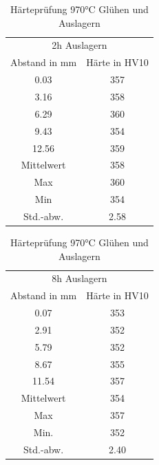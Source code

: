 \documentclass[a4paper, 11pt]{tubsreprt}
\begin{document}
\begin{table}[t] 	%
\begin{tabular}{c | c}
\multicolumn{2}{c}{2h Auslagern} \\
\cline{1-2}
Abstand in mm & Härte in HV10 \\
0.03 & 357 \\
3.16 & 358 \\
6.29 & 360 \\
9.43 & 354 \\
12.56 & 359 \\
\hline
Mittelwert & 358 \\
Max & 360 \\
Min & 354 \\
Std.-abw. & 2.58 \\
\end{tabular}
\begin{tabular}{c | c}
\multicolumn{2}{c}{8h Auslagern} \\
\cline{1-2}
Abstand in mm & Härte in HV10 \\
0.07	&		353 \\
2.91	&		352 \\
5.79	&		352\\
8.67	& 		355\\
11.54	& 		357\\
\hline
Mittelwert &	354\\
Max	& 			357\\
Min. &			352	\\	
Std.-abw.	&	2.40\\

\end{tabular}
\caption{Härteprüfung 970°C Glühen und Auslagern}
\label{heartepruefung9702h}
\end{table}
\end{document}

